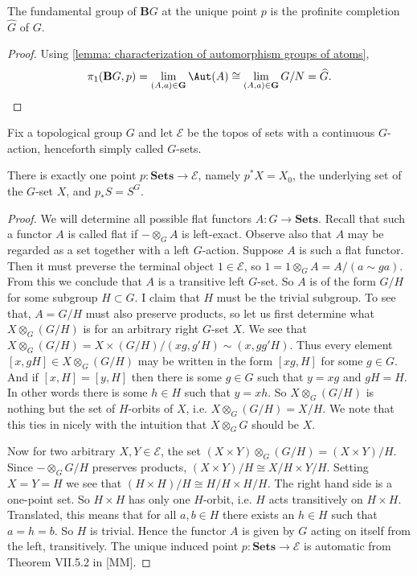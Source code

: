 \begin{corollary}
The fundamental group of $\mathbf{B}G$ at the unique point $p$ is the profinite completion $\widehat{G}$ of $G$.
\end{corollary}
\begin{proof}
Using \cref{lemma: characterization of automorphism groups of atoms},
\[ \pi_1(\mathbf{B}G,p) = \lim_{(A,a) \in \mathbf{G}} \Aut(A) \cong \lim_{(A,a) \in \mathbf{G}} G/N = \widehat{G}. \]
\end{proof}


Fix a topological group $G$ and let $\mathscr{E}$ be the topos of sets with a continuous $G$-action, henceforth simply called $G$-sets.

\begin{theorem}
There is exactly one point $p : \mathbf{Sets} \to \mathscr{E}$, namely $p^*X = X_0$, the underlying set of the $G$-set $X$, and $p_*S = S^G$.
\end{theorem}
\begin{proof}
We will determine all possible flat functors $A : G \to \mathbf{Sets}$. Recall that such a functor $A$ is called flat if $- \otimes_{G} A$ is left-exact. Observe also that $A$ may be regarded as a set together with a left $G$-action. Suppose $A$ is such a flat functor. Then it must preverse the terminal object $1 \in \mathscr{E}$, so $1 = 1 \otimes_G A = A / \left(a \sim ga \right)$. From this we conclude that $A$ is a transitive left $G$-set. So $A$ is of the form $G/H$ for some subgroup $H \subset G$. I claim that $H$ must be the trivial subgroup. To see that, $A = G/H$ must also preserve products, so let us first determine what $X \otimes_G (G/H)$ is for an arbitrary right $G$-set $X$. We see that $X \otimes_G (G/H) = X \times (G/H) / (xg, g'H) \sim (x, gg'H)$. Thus every element $[x,gH] \in X \otimes_G (G/H)$ may be written in the form $[xg,H]$ for some $g \in G$. And if $[x,H] = [y,H]$ then there is some $g \in G$ such that $y = xg$ and $gH = H$. In other words there is some $h \in H$ such that $y = xh$. So $X \otimes_G (G/H)$ is nothing but the set of $H$-orbits of $X$, i.e. $X \otimes_G (G/H) = X/H$. We note that this ties in nicely with the intuition that $X \otimes_G G$ should be $X$.

Now for two arbitrary $X,Y \in \mathscr{E}$, the set $(X \times Y) \otimes_G (G/H) = (X \times Y)/H$. Since $- \otimes_G G/H$ preserves products, $(X \times Y) /H \cong X/H \times Y/H$. Setting $X=Y=H$ we see that $(H \times H) / H \cong H/H \times H/H$. The right hand side is a one-point set. So $H \times H$ has only one $H$-orbit, i.e. $H$ acts transitively on $H \times H$. Translated, this means that for all $a,b \in H$ there exists an $h \in H$ such that $a = h = b$. So $H$ is trivial. Hence the functor $A$ is given by $G$ acting on itself from the left, transitively. The unique induced point $p : \mathbf{Sets} \to \mathscr{E}$ is automatic from Theorem VII.5.2 in [MM]. 
\end{proof}

